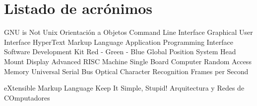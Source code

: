 \chapter{Listado de acrónimos}

{\small
\begin{acronym}[XXXXXXXX]
       {\acs{GNU} is Not Unix}
        {Orientación a Objetos}
       {Command Line Interface}
       {Graphical User Interface}
      {HyperText Markup Language}
       {Application Programming Interface}
       {Software Development Kit}
       {Red - Green - Blue}
       {Global Position System}
       {Head Mount Display}
       {Advanced RISC Machine}
       {Single Board Computer}
       {Random Access Memory}
       {Universal Serial Bus}
       {Optical Character Recognition}
       {Frames per Second}

       {eXtensible Markup Language}
      {Keep It Simple, Stupid!}
      {Arquitectura y Redes de COmputadores}

\end{acronym}
}




